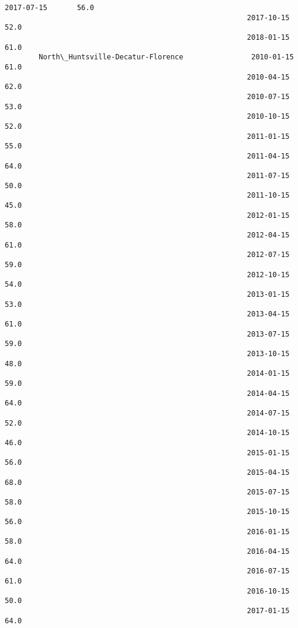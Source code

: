 \documentclass[11pt]{article}
\begin{document}
\begin{Verbatim}[commandchars=\\\{\}]
                                                         2017-07-15       56.0   
                                                         2017-10-15       52.0   
                                                         2018-01-15       61.0   
        North\_Huntsville-Decatur-Florence                2010-01-15       61.0   
                                                         2010-04-15       62.0   
                                                         2010-07-15       53.0   
                                                         2010-10-15       52.0   
                                                         2011-01-15       55.0   
                                                         2011-04-15       64.0   
                                                         2011-07-15       50.0   
                                                         2011-10-15       45.0   
                                                         2012-01-15       58.0   
                                                         2012-04-15       61.0   
                                                         2012-07-15       59.0   
                                                         2012-10-15       54.0   
                                                         2013-01-15       53.0   
                                                         2013-04-15       61.0   
                                                         2013-07-15       59.0   
                                                         2013-10-15       48.0   
                                                         2014-01-15       59.0   
                                                         2014-04-15       64.0   
                                                         2014-07-15       52.0   
                                                         2014-10-15       46.0   
                                                         2015-01-15       56.0   
                                                         2015-04-15       68.0   
                                                         2015-07-15       58.0   
                                                         2015-10-15       56.0   
                                                         2016-01-15       58.0   
                                                         2016-04-15       64.0   
                                                         2016-07-15       61.0   
                                                         2016-10-15       50.0   
                                                         2017-01-15       64.0   

\end{Verbatim}
\end{document}
